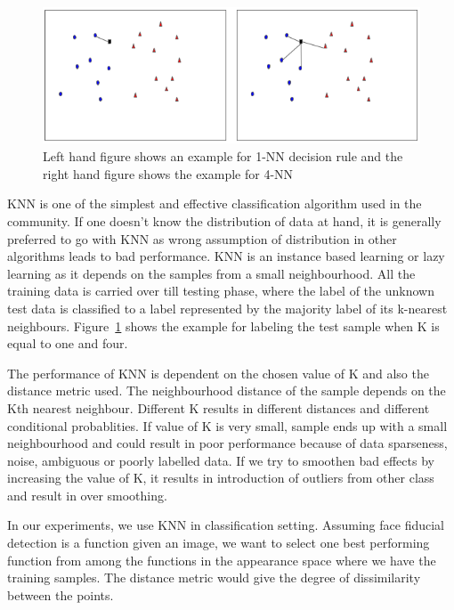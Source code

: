 


\begin{figure}
    \centering
    \includegraphics[width=5in, height=1.6in]{concepts/figures/knn.png}
    \caption{Left hand figure shows an example for 1-NN decision rule and the right hand figure shows the example for 4-NN}
    \label{fig:sample_knn_example}
\end{figure}

KNN is one of the simplest and effective classification algorithm used in the community. 
If one doesn't know the distribution of data at hand, it is generally preferred to go 
with KNN as wrong assumption of distribution in other algorithms leads to bad performance.
KNN is an instance based learning or lazy learning as it depends on the samples from a 
small neighbourhood. All the training data is carried over till testing phase, where the 
label of the unknown test data is classified to a label represented by the majority label
of its k-nearest neighbours. Figure~\ref{fig:sample_knn_example} shows the example for labeling the test sample when
K is equal to one and four.

The performance of KNN is dependent on the chosen value of K and also the distance metric
used. The neighbourhood distance of the sample depends on the Kth nearest neighbour. 
Different K results in different distances and different conditional probablities. If value
of K is very small, sample ends up with a small neighbourhood and could result in poor
performance because of data sparseness, noise, ambiguous or poorly labelled data. If we
try to smoothen bad effects by increasing the value of K, it results in introduction of 
outliers from other class and result in over smoothing.

In our experiments, we use KNN in classification setting. Assuming face fiducial detection
is a function given an image, we want to select one best performing function from among the 
functions in the appearance space where we have the training samples. The distance metric 
would give the degree of dissimilarity between the points.
